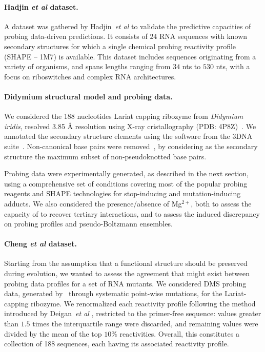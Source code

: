 \documentclass[a4,center,fleqn]{NAR}
\newcommand{\Software}[1]{\text{\ttfamily\bfseries #1}}
\newcommand{\OurTool}{\Software{IPANEMAP}\xspace}
\newcommand{\etal}{~\emph{et al} }
\begin{document}
\paragraph{Hadjin \emph{et al} dataset.} 
A dataset was gathered by Hadjin\etal\cite{Hajdin2013} to validate the predictive capacities of probing data-driven predictions. It consists of $24$ RNA sequences with known secondary structures for which a single chemical probing reactivity profile (SHAPE -- 1M7) is available.
This dataset includes sequences originating from a variety of organisms, and spans lengths ranging from $34$ nts to $530$ nts, with a focus on riboswitches and complex RNA architectures. 

\paragraph{Didymium structural model and probing data.} 
We considered the 188 nucleotides Lariat capping ribozyme from {\itshape Didymium iridis}, resolved 3.85 \AA{} resolution using X-ray cristallography (PDB: 4P8Z)~\citep{Meyer2014}.  We annotated the secondary structure elements using the \Software{DSSR} software from the 3DNA suite~\cite{Lu2015}. Non-canonical base pairs were removed~\citep{Smit2008}, by considering as the secondary structure the maximum subset of non-pseudoknotted base pairs.

Probing data were experimentally generated, as described in the next section, using a comprehensive set of conditions covering most of the popular probing reagents and SHAPE technologies for stop-inducing and mutation-inducing adducts. We also considered the presence/absence of Mg$^{2+}$, both to assess the capacity of \OurTool{} to recover tertiary interactions, and to assess the induced discrepancy on probing profiles and pseudo-Boltzmann ensembles.


\paragraph{Cheng  \emph{et al} dataset.} 
Starting from the assumption that a functional structure should be preserved during evolution, we wanted to assess the agreement that might exist between probing data profiles for a set of RNA mutants. 
We considered DMS probing data, generated by~\cite{Cheng2017} through systematic point-wise mutations, for the Lariat-capping ribozyme. We renormalized each reactivity profile following the method introduced by Deigan\etal\cite{Deigan2009}, restricted to the primer-free sequence: values greater than $1.5 $ times the interquartile range were discarded, and remaining values were divided by the mean of the top $10\%$ reactivities.  Overall, this constitutes a collection of 188 sequences, each having its associated reactivity profile.
\end{document}
